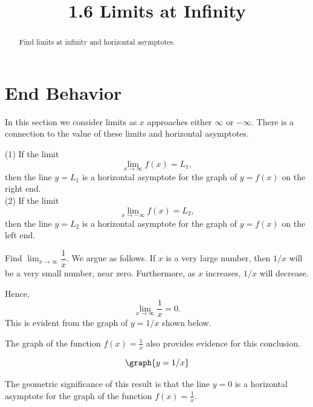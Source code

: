 \documentclass[handout]{ximera}
\title{1.6 Limits at Infinity}
\begin{document}
\begin{abstract}
Find limits at infinity and horizontal asymptotes.
\end{abstract}

\maketitle

\section{End Behavior}
 




In this section we consider limits as $x$ approaches either $\infty$ or $-\infty$.
There is a connection to the value of these limits and horizontal asymptotes.

\begin{theorem}
(1) If the limit
\[
\lim_{x \to \infty} f(x) = L_1,
\]
then the line $y=L_1$ is a horizontal asymptote for the graph of $y = f(x)$ on the right end.\\
(2) If the limit
\[
\lim_{x \to -\infty} f(x) = L_2,
\]
then the line $y=L_2$ is a horizontal asymptote for the graph of $y = f(x)$ on the left end.
\end{theorem}



\begin{example}[example 1]
Find $\lim_{x \to \infty} \dfrac{1}{x}.$
  We argue as follows. If $x$ is a very large number, 
	then $1/x$ will be a very small number, near zero.  Furthermore, as $x$ increases, $1/x$ will decrease.
	
	Hence,
	\[\lim_{x \to \infty} \frac{1}{x}= 0.\]
	This is evident from the graph of $y=1/x$ shown below.
	
	
	The graph of the function $f(x) = \frac{1}{x}$ also provides evidence for this conclusion.  
	
	\[\graph{y=1/x}\]
	
	The geometric significance of this result is that the line $y=0$  
is a horizontal asymptote for the graph of the function $f(x) = \frac{1}{x}$.
\end{example}
\end{document}
